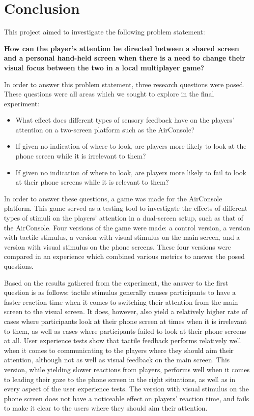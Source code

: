 \chapter{Conclusion}\label{ch:conclusion}
This project aimed to investigate the following problem statement:

\begin{changemargin}{1cm}{1cm}
\textbf{How can the player’s attention be directed between a shared screen and a personal hand-held screen when there is a need to change their visual focus between the two in a local multiplayer game?}
\end{changemargin}

In order to answer this problem statement, three research questions were posed. These questions were all areas which we sought to explore in the final experiment:

\begin{itemize}
\item What effect does different types of sensory feedback have on the players' attention on a two-screen platform such as the AirConsole?
\item If given no indication of where to look, are players more likely to look at the phone screen while it is irrelevant to them?
\item If given no indication of where to look, are players more likely to fail to look at their phone screens while it is relevant to them?
\end{itemize}

In order to answer these questions, a game was made for the AirConsole platform. This game served as a testing tool to investigate the effects of different types of stimuli on the players’ attention in a dual-screen setup, such as that of the AirConsole. Four versions of the game were made: a control version, a version with tactile stimulus, a version with visual stimulus on the main screen, and a version with visual stimulus on the phone screens. These four versions were compared in an experience which combined various metrics to answer the posed questions.

Based on the results gathered from the experiment, the answer to the first question is as follows: tactile stimulus generally causes participants to have a faster reaction time when it comes to switching their attention from the main screen to the visual screen. It does, however, also yield a relatively higher rate of cases where participants look at their phone screen at times when it is irrelevant to them, as well as cases where participants failed to look at their phone screens at all. User experience tests show that tactile feedback performs relatively well when it comes to communicating to the players where they should aim their attention, although not as well as visual feedback on the main screen. This version, while yielding slower reactions from players, performs well when it comes to leading their gaze to the phone screen in the right situations, as well as in every aspect of the user experience tests. The version with visual stimulus on the phone screen does not have a noticeable effect on players’ reaction time, and fails to make it clear to the users where they should aim their attention.

